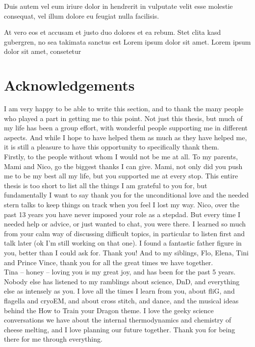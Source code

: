 Duis autem vel eum iriure dolor in hendrerit in vulputate velit esse molestie consequat, vel illum dolore eu feugiat nulla facilisis.   

At vero eos et accusam et justo duo dolores et ea rebum. Stet clita kasd gubergren, no sea takimata sanctus est Lorem ipsum dolor sit amet. Lorem ipsum dolor sit amet, consetetur

\newpage

\section*{Acknowledgements}
I am very happy to be able to write this section, and to thank the many people who played a part in getting me to this point. Not just this thesis, but much of my life has been a group effort, with wonderful people supporting me in different aspects. And while I hope to have helped them as much as they have helped me, it is still a pleasure to have this opportunity to specifically thank them. \\

Firstly, to the people without whom I would not be me at all. To my parents, Mami and Nico, go the biggest thanks I can give. Mami, not only did you push me to be my best all my life, but you supported me at every stop. This entire thesis is too short to list all the things I am grateful to you for, but fundamentally I want to say thank you for the unconditional love and the needed stern talks to keep things on track when you feel I lost my way. Nico, over the past 13 years you have never imposed your role as a stepdad. But every time I needed help or advice, or just wanted to chat, you were there. I learned so much from your calm way of discussing difficult topics, in particular to listen first and talk later (ok I'm still working on that one). I found a fantastic father figure in you, better than I could ask for. Thank you! And to my siblings, Flo, Elena, Tini and Prince Vince, thank you for all the great times we have together. \\

Tina -- honey -- loving you is my great joy, and has been for the past 5 years. Nobody else has listened to my ramblings about science, DnD, and everything else as intensely as you. I love all the times I learn from you, about fliG, and flagella and cryoEM, and about cross stitch, and dance, and the musical ideas behind the How to Train your Dragon theme. I love the geeky science conversations we have about the internal thermodynamics and chemistry of cheese melting, and I love planning our future together. Thank you for being there for me through everything. \\

